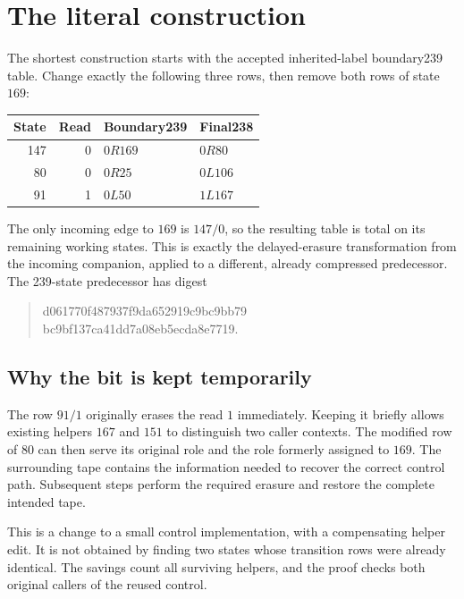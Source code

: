 \section{The literal construction}
\label{sec:construction}

The shortest construction starts with the accepted inherited-label
boundary239 table. Change exactly the following three rows, then remove
both rows of state $169$:

\begin{center}
\begin{tabular}{rrll}
\toprule
State & Read & Boundary239 & Final238\\
\midrule
147&0&$0R169$&$0R80$\\
80&0&$0R25$&$0L106$\\
91&1&$0L50$&$1L167$\\
\bottomrule
\end{tabular}
\end{center}

The only incoming edge to $169$ is $147/0$, so the resulting table is
total on its remaining working states. This is exactly the delayed-erasure
transformation from the incoming companion, applied to a different,
already compressed predecessor. The 239-state predecessor has digest
\begin{quote}\small\ttfamily
d061770f487937f9da652919c9bc9bb79\\
bc9bf137ca41dd7a08eb5ecda8e7719.
\end{quote}

\subsection{Why the bit is kept temporarily}

The row $91/1$ originally erases the read $1$ immediately. Keeping it
briefly allows existing helpers $167$ and $151$ to distinguish two caller
contexts. The modified row of $80$ can then serve its original role and
the role formerly assigned to $169$. The surrounding tape contains the
information needed to recover the correct control path. Subsequent steps
perform the required erasure and restore the complete intended tape.

This is a change to a small control implementation, with a compensating
helper edit. It is not obtained by finding two states whose transition
rows were already identical. The savings count all surviving helpers,
and the proof checks both original callers of the reused control.

